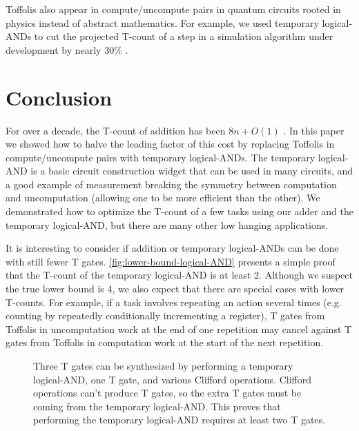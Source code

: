 \documentclass[twocolumn]{revtex4-1}
\newcommand{\qT}{\gate{T}}
\newcommand{\qS}{\gate{S}}
\begin{document}
Toffolis also appear in compute/uncompute pairs in quantum circuits rooted in physics instead of abstract mathematics.
For example, we used temporary logical-ANDs to cut the projected T-count of a step in a simulation algorithm under development by nearly 30\% \citep{RyanEmails2017}.


\section{Conclusion}
\label{sec:conclusion}

For over a decade, the T-count of addition has been $8n + O(1)$ \citep{Amy2013, Barenco1995, Cuccaro2004}.
In this paper we showed how to halve the leading factor of this cost by replacing Toffolis in compute/uncompute pairs with temporary logical-ANDs.
The temporary logical-AND is a basic circuit construction widget that can be used in many circuits, and a good example of measurement breaking the symmetry between computation and uncomputation (allowing one to be more efficient than the other).
We demonstrated how to optimize the T-count of a few tasks using our adder and the temporary logical-AND, but there are many other low hanging applications.

It is interesting to consider if addition or temporary logical-ANDs can be done with still fewer T gates.
\autoref{fig:lower-bound-logical-AND} presents a simple proof that the T-count of the temporary logical-AND is at least 2.
Although we suspect the true lower bound is 4, we also expect that there are special cases with lower T-counts.
For example, if a task involves repeating an action several times (e.g. counting by repeatedly conditionally incrementing a register), T gates from Toffolis in uncomputation work at the end of one repetition may cancel against T gates from Toffolis in computation work at the start of the next repetition.

\begin{figure}
  \resizebox{\linewidth}{!}{
    \Qcircuit @R=0.7em @C=0.7em {
      &\qT &\qw && &&&\ctrl{2}&\qw     &\ctrl{3}&\qw     &\qw &\qw     &\ctrl{3}&\qw     &\ctrl{2}&\qw &\\
      &\qT &\qw &&=&&&\targ   &\ctrl{1}&\qw     &\ctrl{1}&\qw &\ctrl{1}&\qw     &\ctrl{1}&\targ   &\qw &\\
      &\qT &\qw && &&&\targ   &\ctrl{1}&\targ   &\targ   &\qT &\targ   &\targ   &\ctrl{1}&\targ   &\qw &\\
      &    &    && &&&        &        &\targ   &\qw     &\qS &\qw     &\targ   &\qw     &        &    &\\
    }
  }
  \caption{
	Three T gates can be synthesized by performing a temporary logical-AND, one T gate, and various Clifford operations.
	Clifford operations can't produce T gates, so the extra T gates must be coming from the temporary logical-AND.
	This proves that performing the temporary logical-AND requires at least two T gates.
  }
  \label{fig:lower-bound-logical-AND}
\end{figure}
\end{document}
